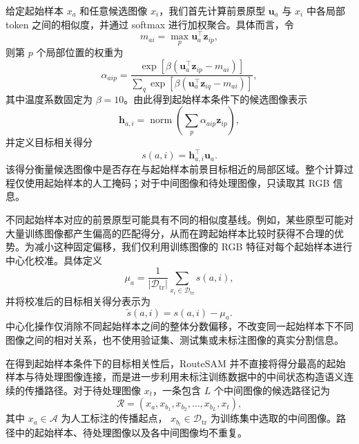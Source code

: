\documentclass[UTF8,a4paper,10pt]{ctexart}
\begin{document}
给定起始样本 $x_a$ 和任意候选图像 $x_i$，我们首先计算前景原型 $\mathbf{u}_a$ 与 $x_i$ 中各局部 token 之间的相似度，并通过 softmax 进行加权聚合。具体而言，令
\begin{equation}
m_{ai}
=
\max_{p}
\mathbf{u}_a^{\top}\mathbf{z}_{ip},
\end{equation}
则第 $p$ 个局部位置的权重为
\begin{equation}
\alpha_{aip}
=
\frac{
\exp\left[
\beta
\left(
\mathbf{u}_a^{\top}\mathbf{z}_{ip}
-
m_{ai}
\right)
\right]
}{
\sum_{q}
\exp\left[
\beta
\left(
\mathbf{u}_a^{\top}\mathbf{z}_{iq}
-
m_{ai}
\right)
\right]
},
\end{equation}
其中温度系数固定为 $\beta=10$。由此得到起始样本条件下的候选图像表示
\begin{equation}
\mathbf{h}_{a,i}
=
\operatorname{norm}
\left(
\sum_{p}
\alpha_{aip}\mathbf{z}_{ip}
\right),
\end{equation}
并定义目标相关得分
\begin{equation}
s(a,i)
=
\mathbf{h}_{a,i}^{\top}\mathbf{u}_a.
\end{equation}
该得分衡量候选图像中是否存在与起始样本前景目标相近的局部区域。整个计算过程仅使用起始样本的人工掩码；对于中间图像和待处理图像，只读取其 RGB 信息。

不同起始样本对应的前景原型可能具有不同的相似度基线。例如，某些原型可能对大量训练图像都产生偏高的匹配得分，从而在跨起始样本比较时获得不合理的优势。为减小这种固定偏移，我们仅利用训练图像的 RGB 特征对每个起始样本进行中心化校准。具体定义
\begin{equation}
\mu_a
=
\frac{1}{|\mathcal{D}_{\mathrm{tr}}|}
\sum_{x_i\in\mathcal{D}_{\mathrm{tr}}}
s(a,i),
\end{equation}
并将校准后的目标相关得分表示为
\begin{equation}
\widetilde{s}(a,i)
=
s(a,i)-\mu_a.
\end{equation}
中心化操作仅消除不同起始样本之间的整体分数偏移，不改变同一起始样本下不同图像之间的相对关系，也不使用验证集、测试集或未标注图像的真实分割信息。

在得到起始样本条件下的目标相关性后，RouteSAM 并不直接将得分最高的起始样本与待处理图像连接，而是进一步利用未标注训练数据中的中间状态构造语义连续的传播路径。对于待处理图像 $x_t$，一条包含 $L$ 个中间图像的候选路径记为
\begin{equation}
\mathcal{R}
=
\left(
x_a,
x_{b_1},
x_{b_2},
\ldots,
x_{b_L},
x_t
\right),
\end{equation}
其中 $x_a\in\mathcal{A}$ 为人工标注的传播起点，
$x_{b_l}\in\mathcal{D}_{\mathrm{tr}}$ 为训练集中选取的中间图像。路径中的起始样本、待处理图像以及各中间图像均不重复。
\end{document}
